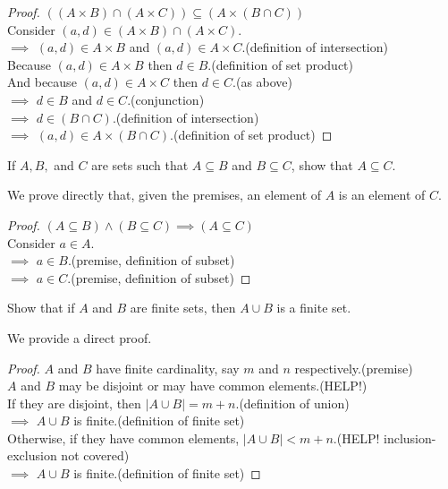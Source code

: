 \documentclass[a4paper]{exam}
\theoremstyle{definition}
\newcommand\union{\cup}
\newcommand\interx{\cap}
\begin{document}
\begin{questions}
\begin{parts}
\begin{solution}
      \begin{proof}$ ((A \times B) \interx (A \times C)) \subseteq (A \times (B \interx C))$\\
        Consider $(a,d)\in (A \times B) \interx (A \times C)$.\\
        $\implies$ $(a,d)\in A\times B$ and $(a,d)\in A\times C$.\hfill(definition of intersection)\\
        Because $(a,d)\in A\times B$ then $d\in B$.\hfill(definition of set product)\\
        And because $(a,d)\in A\times C$ then $d\in C$.\hfill(as above)\\
        $\implies$ $d\in B$ and $d\in C$.\hfill(conjunction)\\
        $\implies$ $d\in (B\interx C)$.\hfill(definition of intersection)\\
        $\implies$ $(a,d)\in A\times (B\interx C)$.\hfill(definition of set product)
      \end{proof}
    \end{solution}
  \end{parts}
  
\question If $A, B,$ and $C$ are sets such that $A \subseteq B$ and $B \subseteq C$, show that $A \subseteq C$.

  \begin{solution}
    We prove directly that, given the premises, an element of $A$ is an element of $C$.

    \begin{proof}$(A \subseteq B) \land (B \subseteq C)\implies (A \subseteq C)$\\
      Consider $a\in A$.\\
      $\implies$ $a\in B$.\hfill(premise, definition of subset)\\
      $\implies$ $a\in C$.\hfill(premise, definition of subset)
    \end{proof}
  \end{solution}

\question Show that if $A$ and $B$ are finite sets, then  \( A \union B \) is a finite set.

  \begin{solution}
    We provide a direct proof.

    \begin{proof}
      $A$ and $B$ have finite cardinality, say $m$ and $n$ respectively.\hfill(premise)\\
      $A$ and $B$ may be disjoint or may have common elements.\hfill({\color{red}HELP!})\\
      If they are disjoint, then $|A\union B|=m+n$.\hfill(definition of union)\\
      $\implies$ $A\union B$ is finite.\hfill(definition of finite set)\\
      Otherwise, if they have common elements, $|A\union B|<m+n$.\hfill({\color{red}HELP!} inclusion-exclusion not covered)\\
      $\implies$ $A\union B$ is finite.\hfill(definition of finite set)
    \end{proof}
  \end{solution}
  

\end{questions}
\end{document}
